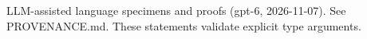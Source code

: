 \documentclass[11pt]{article}
\begin{document}

\bigskip
{\footnotesize LLM-assisted language specimens and proofs (gpt-6, 2026-11-07).
See PROVENANCE.md. These statements validate explicit type arguments.}
\end{document}
